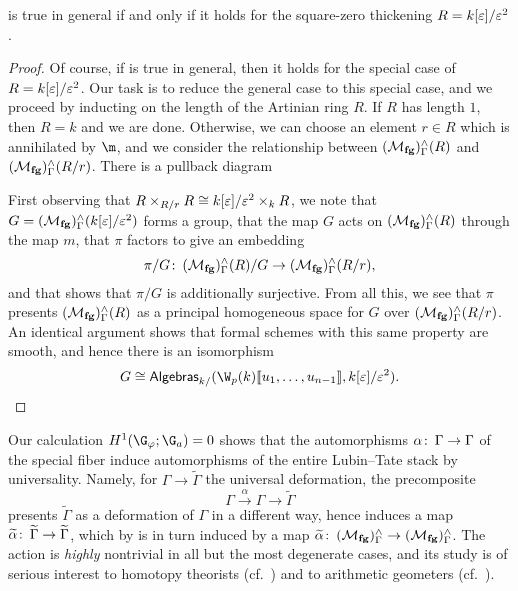 \begin{lemma}
 is true in general if and only if it holds for the square-zero thickening $R = k[\varepsilon]/\varepsilon^2$.
\end{lemma}
\begin{proof}
Of course, if  is true in general, then it holds for the special case of $R = k[\varepsilon]/\varepsilon^2$.  Our task is to reduce the general case to this special case, and we proceed by inducting on the length of the Artinian ring $R$.  If $R$ has length $1$, then $R = k$ and we are done.  Otherwise, we can choose an element $r \in R$ which is annihilated by $\m$, and we consider the relationship between $(\mathcal{M}_{\mathbf{fg}})^\wedge_\Gamma(R)$ and $(\mathcal{M}_{\mathbf{fg}})^\wedge_\Gamma(R/r)$.  There is a pullback diagram
\begin{center}
\end{center}
First observing that $R \times_{R/r} R \cong k[\varepsilon] / \varepsilon^2 \times_k R$, we note that $G = (\mathcal{M}_{\mathbf{fg}})^\wedge_\Gamma(k[\varepsilon]/\varepsilon^2)$ forms a group, that the map $G$ acts on $(\mathcal{M}_{\mathbf{fg}})^\wedge_\Gamma(R)$ through the map $m$, that $\pi$ factors to give an embedding \[\pi/G\colon\thinspace (\mathcal{M}_{\mathbf{fg}})^\wedge_\Gamma(R) / G \to (\mathcal{M}_{\mathbf{fg}})^\wedge_\Gamma(R/r),\] and that  shows that $\pi/G$ is additionally surjective.  From all this, we see that $\pi$ presents $(\mathcal{M}_{\mathbf{fg}})^\wedge_\Gamma(R)$ as a principal homogeneous space for $G$ over $(\mathcal{M}_{\mathbf{fg}})^\wedge_\Gamma(R/r)$.  An identical argument shows that formal schemes with this same property are smooth, and hence there is an isomorphism \[G \cong \CatOf{Algebras}_{k/}(\W_p(k)\ps{u_1, \ldots, u_{n-1}}, k[\eps] / \eps^2). \qedhere\]
\end{proof}

\begin{remark}\label{ActionBySnLiftsToLTn}
Our calculation $H^1(\G_\phi; \G_a) = 0$ shows that the automorphisms $\alpha\colon\thinspace \Gamma \to \Gamma$ of the special fiber induce automorphisms of the entire Lubin--Tate stack by universality.  Namely, for $\Gamma \to \widetilde \Gamma$ the universal deformation, the precomposite \[\Gamma \xrightarrow{\alpha} \Gamma \to \widetilde \Gamma\] presents $\widetilde \Gamma$ as a deformation of $\Gamma$ in a different way, hence induces a map $\widetilde \alpha\colon\thinspace \widetilde \Gamma \to \widetilde \Gamma$, which by  is in turn induced by a map $\widetilde \alpha\colon\thinspace (\mathcal{M}_{\mathbf{fg}})^\wedge_\Gamma \to (\mathcal{M}_{\mathbf{fg}})^\wedge_\Gamma$.  The action is \emph{highly} nontrivial in all but the most degenerate cases, and its study is of serious interest to homotopy theorists (cf.\ ) and to arithmetic geometers (cf.\ ).
\end{remark}

